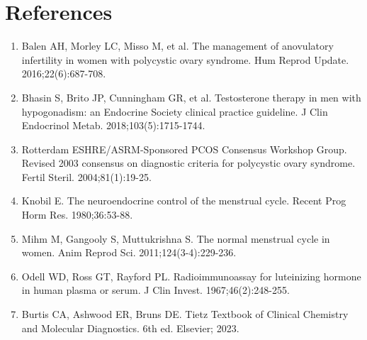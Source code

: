 \section*{References}
\begin{enumerate}
  \item Balen AH, Morley LC, Misso M, et al. The management of anovulatory infertility in women with polycystic ovary syndrome. Hum Reprod Update. 2016;22(6):687-708.
  \item Bhasin S, Brito JP, Cunningham GR, et al. Testosterone therapy in men with hypogonadism: an Endocrine Society clinical practice guideline. J Clin Endocrinol Metab. 2018;103(5):1715-1744.
  \item Rotterdam ESHRE/ASRM-Sponsored PCOS Consensus Workshop Group. Revised 2003 consensus on diagnostic criteria for polycystic ovary syndrome. Fertil Steril. 2004;81(1):19-25.
  \item Knobil E. The neuroendocrine control of the menstrual cycle. Recent Prog Horm Res. 1980;36:53-88.
  \item Mihm M, Gangooly S, Muttukrishna S. The normal menstrual cycle in women. Anim Reprod Sci. 2011;124(3-4):229-236.
  \item Odell WD, Ross GT, Rayford PL. Radioimmunoassay for luteinizing hormone in human plasma or serum. J Clin Invest. 1967;46(2):248-255.
  \item Burtis CA, Ashwood ER, Bruns DE. Tietz Textbook of Clinical Chemistry and Molecular Diagnostics. 6th ed. Elsevier; 2023.
\end{enumerate}

\clearpage
